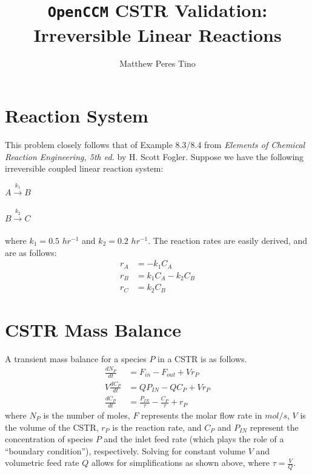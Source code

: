 \documentclass[a4paper,12pt]{article}
\begin{document}
\title{\texttt{OpenCCM} CSTR Validation: Irreversible Linear Reactions}
\author{Matthew Peres Tino}
\maketitle

\section{Reaction System}

This problem closely follows that of Example 8.3/8.4 from \emph{Elements of Chemical Reaction Engineering, 5th ed.} by H. Scott Fogler.
Suppose we have the following irreversible coupled linear reaction system:
\begin{center}
	$A\xrightarrow[]{k_1} B$

	$B\xrightarrow[]{k_2} C$
\end{center}
where $k_1 = 0.5$ $hr^{-1}$ and $k_2 = 0.2$ $hr^{-1}$. 
The reaction rates are easily derived, and are as follows:
\begin{align}
    r_A &= -k_1 C_A \\
    r_B &= k_1 C_A - k_2 C_B \\
    r_C &= k_2 C_B
\end{align}

\section{CSTR Mass Balance}

A transient mass balance for a species $P$ in a CSTR is as follows. 
\begin{align}
    \frac{dN_P}{dt} &= F_{in} - F_{out} + Vr_P\\
    V\frac{dC_P}{dt} &= Q P_{IN} - QC_P + Vr_P \\
    \frac{dC_P}{dt} &= \frac{P_{IN}}{\tau} - \frac{C_P}{\tau} + r_P
\end{align}
where $N_P$ is the number of moles, $F$ represents the molar flow rate in $mol/s$, $V$ is the volume of the CSTR, $r_P$ is the reaction rate, and $C_P$ and $P_{IN}$ represent the concentration of species $P$ and the inlet feed rate (which plays the role of a ``boundary condition''), respectively.
Solving for constant volume $V$ and volumetric feed rate $Q$ allows for simplifications as shown above, where $\tau = \frac{V}{Q}$.
\end{document}
